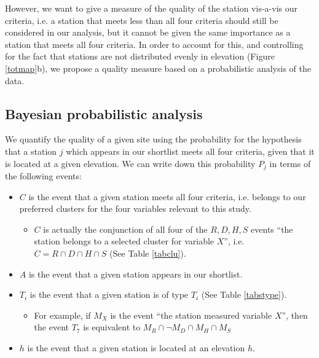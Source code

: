 \documentclass[12pt]{iopart}
\begin{document}
However, we want to give a measure of the quality of the station vis-a-vis our criteria, i.e. a station that meets less than all four criteria should still be considered in our analysis, but it cannot be given the same importance as a station that meets all four criteria. In order to account for this, and controlling for the fact that stations are not distributed evenly in elevation (Figure \ref{totmap}b), we propose a quality measure based on a probabilistic analysis of the data.


\subsection{Bayesian probabilistic analysis}\label{bpa}

We quantify the quality of a given site using the probability for the hypothesis that a station $j$ which appears in our shortlist meets all four criteria, given that it is located at a given elevation. We can write down this probability $P_j$ in terms of the following events:

\begin{itemize}
\item $C$ is the event that a given station meets all four criteria, i.e. belongs to our preferred clusters for the four variables relevant to this study.
\begin{itemize}
\item $C$ is actually the conjunction of all four of the $R,D,H,S$ events ``the station belongs to a selected cluster for variable $X$'', i.e. $C=R\cap D\cap H \cap S$ (See Table \ref{tabclu}).
\end{itemize}
\item $A$ is the event that a given station appears in our shortlist.
\item $T_i$ is the event that a given station is of type $T_i$ (See Table \ref{tabstype}).
\begin{itemize}
\item For example, if $M_X$ is the event ``the station measured variable $X$'', then the event $T_7$ is equivalent to $M_R\cap \neg M_D\cap M_H \cap M_S$
\end{itemize}
\item $h$ is the event that a given station is located at an elevation $h$.
\end{itemize}
\end{document}

